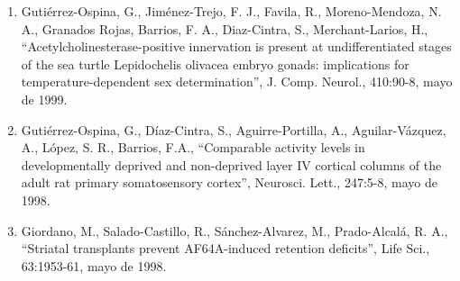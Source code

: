 \begin{enumerate}
\item Gutiérrez-Ospina, G., Jiménez-Trejo, F. J., Favila, R., Moreno-Mendoza, N. A., Granados Rojas, Barrios, F. A., 
Diaz-Cintra, S., Merchant-Larios, H., “Acetylcholinesterase-positive innervation is present at undifferentiated stages of the 
sea turtle Lepidochelis olivacea embryo gonads: implications for temperature-dependent sex determination”, J. Comp. Neurol., 
410:90-8,    mayo de 1999.

\item Gutiérrez-Ospina, G., Díaz-Cintra, S., Aguirre-Portilla, A., Aguilar-Vázquez, A., López, S. R., Barrios, F.A., 
“Comparable activity levels in developmentally deprived and non-deprived layer IV cortical columns of the adult rat primary 
somatosensory cortex”, Neurosci. Lett., 247:5-8,    mayo de 1998.

\item Giordano, M., Salado-Castillo, R., Sánchez-Alvarez, M., Prado-Alcalá, R. A., “Striatal transplants prevent 
AF64A-induced 
retention deficits”, Life Sci., 63:1953-61,  mayo de 1998.

\end{enumerate}

